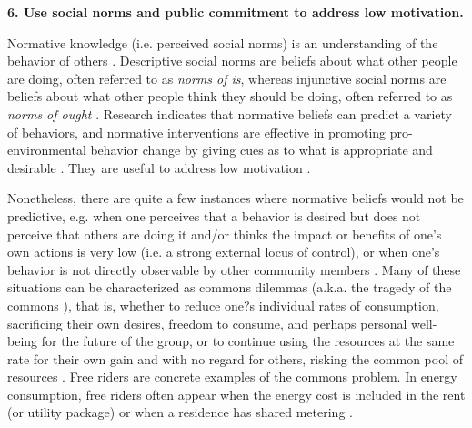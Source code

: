 \vspace{.3cm}
\noindent\textbf{6. Use social norms and public commitment to address low motivation.}
 
Normative knowledge (i.e. perceived social norms) is an understanding of the behavior of others  \citep{Schultz2002}. Descriptive social norms are beliefs about what other people are doing, often referred to as \textit{norms of is}, whereas injunctive social norms are beliefs about what other people think they should be doing, often referred to as \textit{norms of ought}  \citep{Schultz2002}. 
Research indicates that normative beliefs can predict a variety of behaviors, and normative interventions are effective in promoting pro-environmental behavior change by giving cues as to what is appropriate and desirable  \citep{Allcott2011,Schultz2002, Petkov2011,Delmas2013}. They are useful to address low motivation  \citep{schultz2015strategies}. 

Nonetheless, there are quite a few instances where normative beliefs would not be predictive, e.g. when one perceives that a behavior is desired but does not perceive that others are doing it and/or thinks the impact or benefits of one's own actions is very low (i.e. a strong external locus of control), or when one's behavior is not directly observable by other community members  \citep{Schultz2002,ockwell2009reorienting}. Many of these situations can be characterized as commons dilemmas (a.k.a. the tragedy of the commons  \citep{Hardin1968}), that is, whether to reduce one?s individual rates of consumption, sacrificing their own desires, freedom to consume, and perhaps personal well-being for the future of the group, or to continue using the resources at the same rate for their own gain and with no regard for others, risking the common pool of resources  \citep{Edney1978,Edney1980}. Free riders are concrete examples of the commons problem. In energy consumption, free riders often appear when the energy cost is included in the rent (or utility package)  \citep{munley1990electricity} or when a residence has shared metering  \citep{dewees2011impact}.

